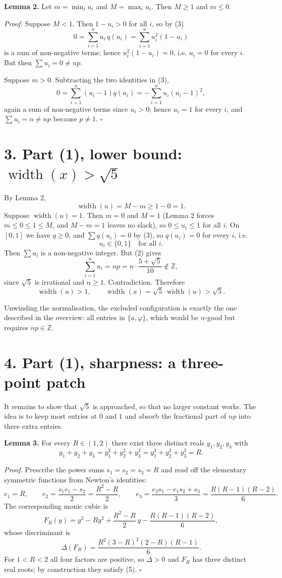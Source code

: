 \documentclass[12pt]{article}
\newcommand{\sumi}{\sum_{i=1}^{n}}
\newcommand{\W}{\operatorname{width}}
\newcommand{\ZZ}{\mathbb Z}
\begin{document}
\textbf{Lemma 2.} Let \(m=\min_i u_i\) and \(M=\max_i u_i\). Then
\(M\ge1\) and \(m\le0\).

\textit{Proof.} Suppose \(M<1\). Then \(1-u_i>0\) for all \(i\), so by (3)
\[
0=\sumi u_i\,q(u_i)=\sumi u_i^2(1-u_i)
\]
is a sum of non-negative terms; hence \(u_i^2(1-u_i)=0\), i.e. \(u_i=0\)
for every \(i\). But then \(\sum u_i=0\ne np\).

Suppose \(m>0\). Subtracting the two identities in (3),
\[
0=\sumi(u_i-1)q(u_i)=-\sumi u_i(u_i-1)^2 ,
\]
again a sum of non-negative terms since \(u_i>0\); hence \(u_i=1\) for
every \(i\), and \(\sum u_i=n\ne np\) because \(p\ne1\). \(\square\)

\section*{3. Part (1), lower bound: \(\W(x)>\sqrt5\)}

By Lemma 2,
\[
\W(u)=M-m\ge1-0=1 .
\]
Suppose \(\W(u)=1\). Then \(m=0\) and \(M=1\) (Lemma 2 forces
\(m\le0\le1\le M\), and \(M-m=1\) leaves no slack), so
\(0\le u_i\le1\) for all \(i\). On \([0,1]\) we have \(q\ge0\), and
\(\sum q(u_i)=0\) by (3), so \(q(u_i)=0\) for every \(i\), i.e.
\[
u_i\in\{0,1\}\quad\text{for all }i .
\]
Then \(\sum u_i\) is a non-negative integer. But (2) gives
\[
\sumi u_i=np=n\cdot\frac{5+\sqrt5}{10}\notin\ZZ,
\]
since \(\sqrt5\) is irrational and \(n\ge1\). Contradiction. Therefore
\[
\boxed{\displaystyle \W(u)>1,
\qquad
\W(x)=\sqrt5\,\W(u)>\sqrt5 .}
\tag{4}
\]

Unwinding the normalisation, the excluded configuration is exactly the
one described in the overview: all entries in \(\{a,\varphi\}\), which
would be \(n\)-good but requires \(np\in\ZZ\).

\section*{4. Part (1), sharpness: a three-point patch}

It remains to show that \(\sqrt5\) is approached, so that no larger
constant works. The idea is to keep most entries at \(0\) and \(1\) and
absorb the fractional part of \(np\) into three extra entries.

\textbf{Lemma 3.} For every \(R\in(1,2)\) there exist three distinct
reals \(y_1,y_2,y_3\) with
\[
y_1+y_2+y_3=y_1^2+y_2^2+y_3^2=y_1^3+y_2^3+y_3^3=R .
\tag{5}
\]

\textit{Proof.} Prescribe the power sums \(s_1=s_2=s_3=R\) and read off
the elementary symmetric functions from Newton's identities:
\[
e_1=R,\qquad
e_2=\frac{s_1e_1-s_2}{2}=\frac{R^2-R}{2},\qquad
e_3=\frac{e_2s_1-e_1s_2+s_3}{3}=\frac{R(R-1)(R-2)}{6}.
\]
The corresponding monic cubic is
\[
F_R(y)=y^3-Ry^2+\frac{R^2-R}{2}\,y-\frac{R(R-1)(R-2)}{6},
\tag{6}
\]
whose discriminant is
\[
\Delta(F_R)=\frac{R^2(3-R)^2(2-R)(R-1)}{6} .
\tag{7}
\]
For \(1<R<2\) all four factors are positive, so \(\Delta>0\) and \(F_R\)
has three distinct real roots; by construction they satisfy (5).
\(\square\)
\end{document}
